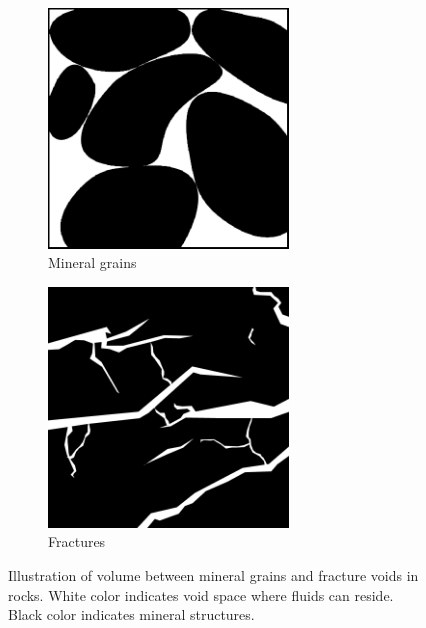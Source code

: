 \begin{figure}[ht]
\begin{subfigure}[b]{0.49\textwidth}
	\centering
    	\includegraphics[width=0.7\textwidth]{figures/mineral_grains.png}
	\caption{Mineral grains} \label{fig:pore_void_space_mineral_grains}
\end{subfigure}
\begin{subfigure}[b]{0.49\textwidth}
	\centering
	\includegraphics[width=0.7\textwidth]{figures/fractures.png}
	\caption{Fractures} \label{fig:pore_void_space_fractures}
\end{subfigure}
\caption{Illustration of volume between mineral grains and fracture voids in rocks. White color indicates void space where fluids can reside. Black color indicates mineral structures.}
\label{fig:pore_void_space}
\end{figure}


